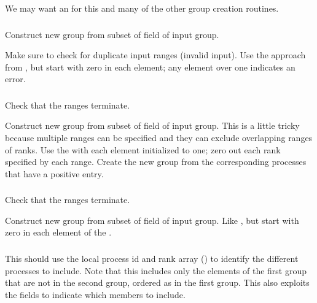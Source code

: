 \documentclass{article}
\begin{document}
  We may want an  for this and many of
  the other group creation routines.

\subsubsection{}
  Construct new group from subset of  field of
  input group.

  Make sure to check for duplicate input ranges (invalid input).  Use the
   approach from , but start
  with zero in each element; any element over one indicates an error.

\subsubsection{}
  Check that the ranges terminate.  

  Construct new group from subset of  field of
  input group.  This is a little tricky because multiple ranges can be
  specified and they can exclude overlapping ranges of ranks.  
  Use the  with each element initialized to one; zero
  out each rank specified by each range.  Create the new group from the
  corresponding processes that have a positive entry.

\subsubsection{}
  Check that the ranges terminate.

  Construct new group from subset of  field of
  input group.  Like , but start with zero in
  each element of the .

\subsubsection{}

This should use the local process id and rank array
() to identify the different
processes to include.  
Note that this includes only the elements of the first
group that are not in the second group, ordered as in the first group.  
This also exploits the  fields to indicate which members to
include.
\end{document}
